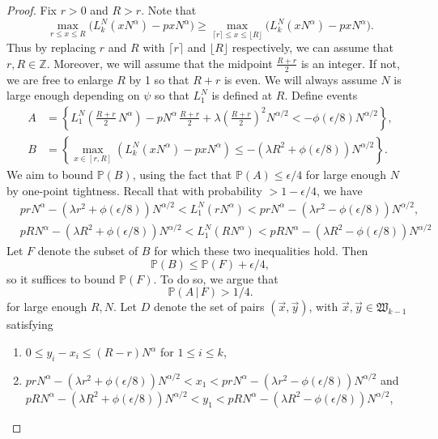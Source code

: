 \documentclass[12pt]{article}
\begin{document}
	\begin{proof}
		
	Fix $r>0$ and $R>r$. Note that
	\[
	\max_{r\leq x\leq R} \big(L_k^N(xN^\alpha) - pxN^\alpha\big) \geq \max_{\lceil r\rceil \leq x \leq \lfloor R\rfloor} \big(L_k^N(xN^\alpha) - pxN^\alpha\big).
	\]
	Thus by replacing $r$ and $R$ with $\lceil r\rceil$ and $\lfloor R\rfloor$ respectively, we can assume that $r,R\in\mathbb{Z}$. Moreover, we will assume that the midpoint $\frac{R+r}{2}$ is an integer. If not, we are free to enlarge $R$ by 1 so that $R+r$ is even. We will always assume $N$ is large enough depending on $\psi$ so that $L_1^N$ is defined at $R$. Define events
	\begin{align*}
	A &= \left\{L_1^N\left(\frac{R+r}{2}\,N^\alpha\right) - pN^\alpha\,\frac{R+r}{2} + \lambda\left(\frac{R+r}{2}\right)^2 N^{\alpha/2} < -\phi(\epsilon/8)N^{\alpha/2}\right\},\\
	B &= \left\{\max_{x\in[r,R]} \left(L_k^N(xN^\alpha) - pxN^\alpha\right) \leq -(\lambda R^2 + \phi(\epsilon/8)) N^{\alpha/2} \right\}.
	\end{align*}
	We aim to bound $\mathbb{P}(B)$, using the fact that $\mathbb{P}(A) \leq \epsilon/4$ for large enough $N$ by one-point tightness. Recall that with probability $>1-\epsilon/4$, we have 
	\begin{align*}
	& prN^\alpha - (\lambda r^2+\phi(\epsilon/8))N^{\alpha/2} < L_1^N(rN^\alpha) <  prN^\alpha - (\lambda r^2-\phi(\epsilon/8))N^{\alpha/2},\\
	& pRN^\alpha - (\lambda R^2+\phi(\epsilon/8))N^{\alpha/2} < L_1^N(RN^\alpha) <  pRN^\alpha - (\lambda R^2-\phi(\epsilon/8))N^{\alpha/2}
	\end{align*}
	Let $F$ denote the subset of $B$ for which these two inequalities hold. Then 
	\[
	\mathbb{P}(B) \leq \mathbb{P}(F) + \epsilon/4,
	\]
	so it suffices to bound $\mathbb{P}(F)$. To do so, we argue that 
	\[
	\mathbb{P}(A\,|\,F) > 1/4.
	\]
	for large enough $R,N$. Let $D$ denote the set of pairs $(\vec{x},\vec{y})$, with $\vec{x},\vec{y}\in\mathfrak{W}_{k-1}$ satisfying 
	\begin{enumerate}[label=(\arabic*)]
		
		\item $0\leq y_i - x_i \leq (R-r)N^\alpha$ for $1\leq i\leq k$,
		
		\item $prN^\alpha - (\lambda r^2+\phi(\epsilon/8))N^{\alpha/2} < x_1 <  prN^\alpha - (\lambda r^2-\phi(\epsilon/8))N^{\alpha/2}$ and $pRN^\alpha - (\lambda R^2+\phi(\epsilon/8))N^{\alpha/2} < y_1 <  pRN^\alpha - (\lambda R^2-\phi(\epsilon/8))N^{\alpha/2}$,
		

\end{enumerate}
\end{proof}
\end{document}
